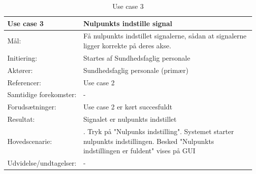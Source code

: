 \begin{table}[h!]
\caption{Use case 3}\label{tab:tabel3}
\begin{tabular}{| l | >{\raggedright\arraybackslash}p{11cm} |}
   \hline
   \textbf{Use case 3} & \textbf{Nulpunkts indstille signal}\\ \hline
   Mål: & Få nulpunkts indstillet signalerne, sådan at signalerne ligger korrekte på deres akse. \\ \hline
   Initiering: & Startes af Sundhedsfaglig personale\\ \hline
   Aktører:& Sundhedsfaglig personale (primær)\\ \hline
   Referencer: & Use case 2\\ \hline
   Samtidige forekomster: & -  \\\hline
   Forudsætninger: & Use case 2 er kørt succesfuldt\\ \hline
   Resultat:& Signalet er nulpunkts indstillet\\ \hline
   Hovedscenarie:& 
1. Tryk på "Nulpunks indstilling"\newline
2. Systemet starter nulpunkts indstillingen\newline
3. Besked "Nulpunkts indstillingen er fuldent" vises på GUI\\\hline
Udvidelse/undtagelser: & - \\\hline
\end{tabular}
\end{table}

